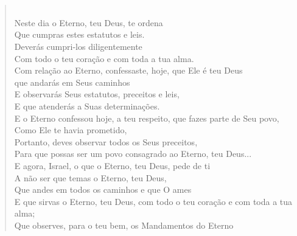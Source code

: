 \chapter*{}
\thispagestyle{empty}
\begin{verse}
\\[10pt]

Neste dia o Eterno, teu Deus, te ordena\\
Que cumpras estes estatutos e leis.\\
Deverás cumpri-los diligentemente\\
Com todo o teu coração e com toda a tua alma.\\[10pt]

Com relação ao Eterno, confessaste, hoje, que Ele é teu \qb{}Deus\\
que andarás em Seus caminhos\\
E observarás Seus estatutos, preceitos e leis,\\
E que atenderás a Suas determinações.\\[10pt]
 
E o Eterno confessou hoje, a teu respeito, que fazes parte \qb{}de Seu povo,\\
Como Ele te havia prometido,\\
Portanto, deves observar todos os Seus preceitos,\\
Para que possas ser um povo consagrado ao Eterno, teu \qb{}Deus...\\[10pt]

E agora, Israel, o que o Eterno, teu Deus, pede de ti\\
A não ser que temas o Eterno, teu Deus,\\[10pt]

Que andes em todos os caminhos e que O ames\\
E que sirvas o Eterno, teu Deus, com todo o teu coração \qb{}e com toda a tua alma;\\
Que observes, para o teu bem, os Mandamentos do \qb{}Eterno \enlargethispage{\textheight}
\end{verse}


%
%
%
%


